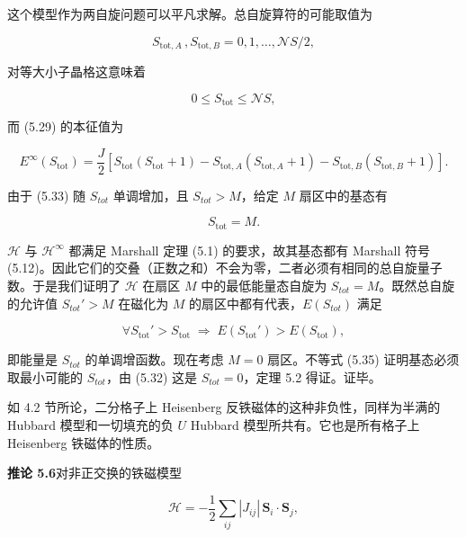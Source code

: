 这个模型作为两自旋问题可以平凡求解。总自旋算符的可能取值为

\begin{equation*}
S _ {\mathrm{tot},A} \, , S _ {\mathrm{tot},B} = 0, 1, \dots , \mathcal {N} S / 2 ,
\tag{5.31}
\end{equation*}

对等大小子晶格这意味着

\begin{equation*}
0 \leq S _ {\mathrm{tot}} \leq \mathcal {N} S ,
\tag{5.32}
\end{equation*}

而 (5.29) 的本征值为

\begin{equation*}
E ^ {\infty} \left( S _ {\mathrm{tot}} \right) = \frac {J}{2} \left[ S _ {\mathrm{tot}} \left( S _ {\mathrm{tot}} + 1 \right) - S _ {\mathrm{tot},A} \left( S _ {\mathrm{tot},A} + 1 \right) - S _ {\mathrm{tot},B} \left( S _ {\mathrm{tot},B} + 1 \right) \right].
\tag{5.33}
\end{equation*}

由于 (5.33) 随 $S_{tot}$ 单调增加，且 $S_{tot} > M$，给定 $M$ 扇区中的基态有

\begin{equation*}
S _ {\mathrm{tot}} = M.
\tag{5.34}
\end{equation*}

$\mathcal{H}$ 与 $\mathcal{H}^{\infty}$ 都满足 Marshall 定理 (5.1) 的要求，故其基态都有 Marshall 符号 (5.12)。因此它们的交叠（正数之和）不会为零，二者必须有相同的总自旋量子数。于是我们证明了 $\mathcal{H}$ 在扇区 $M$ 中的最低能量态自旋为 $S_{tot} = M$。既然总自旋的允许值 $S_{tot}' > M$ 在磁化为 $M$ 的扇区中都有代表，$E(S_{tot})$ 满足

\begin{equation*}
\forall S _ {\mathrm{tot}} ' > S _ {\mathrm{tot}} \; \Rightarrow \; E ( S _ {\mathrm{tot}} ' ) > E ( S _ {\mathrm{tot}} ),
\tag{5.35}
\end{equation*}

即能量是 $S_{tot}$ 的单调增函数。现在考虑 $M = 0$ 扇区。不等式 (5.35) 证明基态必须取最小可能的 $S_{tot}$，由 (5.32) 这是 $S_{tot} = 0$，定理 5.2 得证。证毕。

如 4.2 节所论，二分格子上 Heisenberg 反铁磁体的这种非负性，同样为半满的 Hubbard 模型和一切填充的负 $U$ Hubbard 模型所共有。它也是所有格子上 Heisenberg 铁磁体的性质。

\medskip
\noindent\textbf{推论 5.6}\quad 对非正交换的铁磁模型

\begin{equation*}
\mathcal {H} = - \frac {1}{2} \sum_ {ij} | J _ {ij} | \, \mathbf {S} _ {i} \cdot \mathbf {S} _ {j} ,
\tag{5.36}
\end{equation*}

